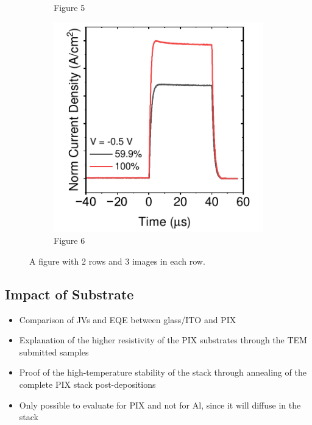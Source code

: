 \begin{figure}[htbp]
\begin{subfigure}[b]{0.3\textwidth}
        \caption{Figure 5}
    \end{subfigure}
    \hfill
    \begin{subfigure}[b]{0.3\textwidth}
        \centering
        \includegraphics[width=\textwidth]{chapters/material_properties/images/tpc-12CsBr.pdf}
        \caption{Figure 6}
    \end{subfigure}

    \caption{A figure with 2 rows and 3 images in each row.}
    \label{fig:two_rows_three_columns}
\end{figure}




\subsection{Impact of Substrate}

\begin{itemize}
    \item Comparison of JVs and EQE between glass/ITO and PIX 
    \item Explanation of the higher resistivity of the PIX substrates through the TEM submitted samples
    \item Proof of the high-temperature stability of the stack through annealing of the complete PIX stack post-depositions
    \item Only possible to evaluate for PIX and not for Al, since it will diffuse in the stack 
\end{itemize}


